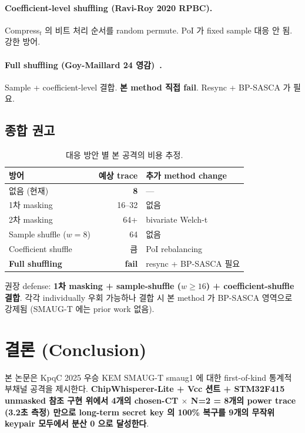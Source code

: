 \documentclass[11pt]{article}
\theoremstyle{plain}
\theoremstyle{definition}
\theoremstyle{remark}
\begin{document}
\paragraph{Coefficient-level shuffling (Ravi-Roy 2020 RPBC).}
Compress$_t$ 의 비트 처리 순서를 random permute. PoI 가 fixed sample
대응 안 됨. 강한 방어.

\paragraph{Full shuffling (Goy-Maillard 24 영감)~\citep{goy24}.}
Sample + coefficient-level 결합. \textbf{본 method 직접 fail}. Resync
+ BP-SASCA 가 필요.

\subsection{종합 권고}

\begin{table}[h!]
\centering
\caption{대응 방안 별 본 공격의 비용 추정.}
\label{tab:counter}
\small
\begin{tabular}{lrl}
\toprule
방어 & 예상 trace & 추가 method change \\
\midrule
없음 (현재) & \textbf{8} & — \\
1차 masking & 16--32 & 없음 \\
2차 masking & 64+ & bivariate Welch-t \\
Sample shuffle ($w=8$) & 64 & 없음 \\
Coefficient shuffle & 큼 & PoI rebalancing \\
\textbf{Full shuffling} & \textbf{fail} & resync + BP-SASCA 필요 \\
\bottomrule
\end{tabular}
\end{table}

권장 defense: \textbf{1차 masking + sample-shuffle ($w \geq 16$) +
coefficient-shuffle 결합}. 각각 individually 우회 가능하나 결합 시 본
method 가 BP-SASCA 영역으로 강제됨 (SMAUG-T 에는 prior work 없음).

\section{결론 (Conclusion)}
\label{sec:conclusion}

본 논문은 KpqC 2025 우승 KEM SMAUG-T smaug1 에 대한 first-of-kind
통계적 부채널 공격을 제시한다. \textbf{ChipWhisperer-Lite + Vcc 션트 +
STM32F415 unmasked 참조 구현 위에서 4개의 chosen-CT $\times$ N=2 = 8개의
power trace (3.2초 측정) 만으로 long-term secret key 의 100\% 복구를 9개의
무작위 keypair 모두에서 분산 0 으로 달성한다}.
\end{document}
